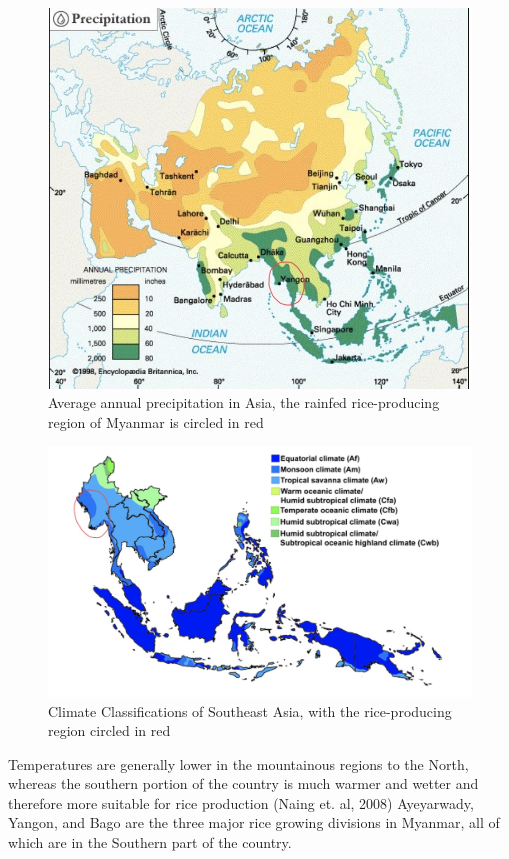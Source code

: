 \documentclass{book}\usepackage{knitr}
\begin{document}
\begin{figure}
\includegraphics[width=\linewidth]{images/myanmar/Image1.jpg}
\caption{Average annual precipitation in Asia, the rainfed rice-producing region of Myanmar is circled in red}
\end{figure}

\begin{figure}
\includegraphics[width=\linewidth]{images/myanmar/Image2.jpg}
\caption{Climate Classifications of Southeast Asia, with the rice-producing region circled in red}
\end{figure}

Temperatures are generally lower in the mountainous regions to the North, whereas the southern portion of the country is much warmer and wetter and therefore more suitable for rice production (Naing et. al, 2008) Ayeyarwady, Yangon, and Bago are the three major rice growing divisions in Myanmar, all of which are in the Southern part of the country. 
\end{document}
